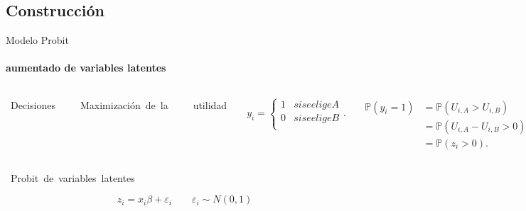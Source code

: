 \subsection{Construcción}

\setwatermark{\fontsize{10pt}{10pt}\selectfont{ }}

{
%
\begin{frame}

\end{frame}
}

\setwatermark{\fontsize{30pt}{30pt}\selectfont{ }}
\begin{frame}{Modelo Probit}
\framesubtitle{aumentado de variables latentes}

\begin{columns}

\vspace*{.5 cm}
\hspace*{.2cm}
\hbox{%
\Huge
\textcolor{applegreen}{Decisiones}
 }

\vspace*{1.0 cm}
\hspace*{.2cm}
 \hbox{%
\Large
\textcolor{beaublue}{Maximización de la}
 }

\vspace*{.3 cm}
\hspace*{.5cm}
 \hbox{%
\Huge
\textcolor{beaublue}{utilidad}
 }


\[ y_{i} = \begin{cases*}
  1 & si se elige A \\
  0 & si se elige B\\ \end{cases*}. \]


\[
\begin{split}
\mathbb{P} (y_{i}=1) &= \mathbb{P} (U_{i,A} >U_{i,B}) \\
&=  \mathbb{P} (U_{i,A} - U_{i,B} > 0) \\
&=  \mathbb{P} (z_i > 0).
\end{split}
\]

  
\end{columns}

\vspace*{1 cm}
\hspace*{.6cm}
\hbox{%
\fontsize{20}{20}\selectfont
\textcolor{darkpastelpurple}{Probit de variables latentes}
 }

 \[ z_i = x_i\beta + \varepsilon_i \qquad  \varepsilon_i \sim N(0,1) \]

\end{frame}

